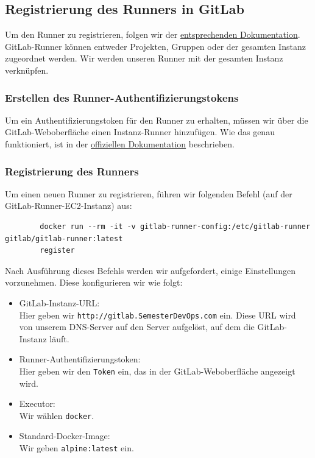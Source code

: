 \documentclass[a4paper,12pt]{article}
\begin{document}
\subsection{Registrierung des Runners in GitLab}
Um den Runner zu registrieren, folgen wir der \href{https://docs.gitlab.com/runner/register/index.html}{entsprechenden Dokumentation}.  
GitLab-Runner können entweder Projekten, Gruppen oder der gesamten Instanz zugeordnet werden.  
Wir werden unseren Runner mit der gesamten Instanz verknüpfen.

\subsubsection{Erstellen des Runner-Authentifizierungstokens}
Um ein Authentifizierungstoken für den Runner zu erhalten, müssen wir über die GitLab-Weboberfläche einen Instanz-Runner hinzufügen.  
Wie das genau funktioniert, ist in der \href{https://docs.gitlab.com/17.6/ee/ci/runners/runners_scope.html#create-an-instance-runner-with-a-runner-authentication-token}{offiziellen Dokumentation} beschrieben.

\subsubsection{Registrierung des Runners}
Um einen neuen Runner zu registrieren, führen wir folgenden Befehl (auf der GitLab-Runner-EC2-Instanz) aus:

\begin{verbatim}
		docker run --rm -it -v gitlab-runner-config:/etc/gitlab-runner gitlab/gitlab-runner:latest
		register
\end{verbatim}

Nach Ausführung dieses Befehls werden wir aufgefordert, einige Einstellungen vorzunehmen. Diese konfigurieren wir wie folgt:
\begin{itemize}
\item GitLab-Instanz-URL: 
	\\ Hier geben wir \texttt{http://gitlab.SemesterDevOps.com} ein. Diese URL wird von unserem DNS-Server auf den Server aufgelöst, auf dem die GitLab-Instanz läuft.
\item Runner-Authentifizierungstoken: 
	\\ Hier geben wir den \texttt{Token} ein, das in der GitLab-Weboberfläche angezeigt wird.
\item Executor: 
	\\ Wir wählen \texttt{docker}.
\item Standard-Docker-Image: 
	\\ Wir geben \texttt{alpine:latest} ein.
\end{itemize}
\end{document}
